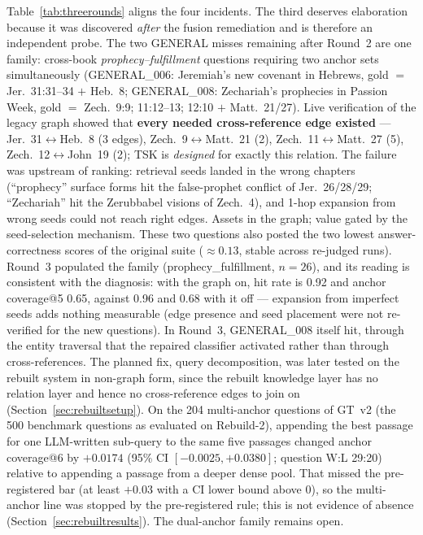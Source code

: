 Table~\ref{tab:threerounds} aligns the four incidents. The third
deserves elaboration because it was discovered \emph{after} the fusion
remediation and is therefore an independent probe. The two GENERAL
misses remaining after Round~2 are one family: cross-book
\emph{prophecy--fulfillment} questions requiring two anchor sets
simultaneously (GENERAL\_006: Jeremiah's new covenant in Hebrews, gold
$=$ Jer.~31:31--34 $+$ Heb.~8; GENERAL\_008: Zechariah's prophecies in
Passion Week, gold $=$ Zech.~9:9; 11:12--13; 12:10 $+$ Matt.~21/27).
Live verification of the legacy graph showed that \textbf{every needed
cross-reference edge existed} --- Jer.~31$\leftrightarrow$Heb.~8 (3 edges),
Zech.~9$\leftrightarrow$Matt.~21 (2), Zech.~11$\leftrightarrow$Matt.~27
(5), Zech.~12$\leftrightarrow$John~19 (2); TSK is \emph{designed} for
exactly this relation. The failure was upstream of ranking: retrieval
seeds landed in the wrong chapters (``prophecy'' surface forms hit the
false-prophet conflict of Jer.~26/28/29; ``Zechariah'' hit the
Zerubbabel visions of Zech.~4), and 1-hop expansion from wrong seeds
could not reach right edges. Assets in the graph; value gated by the
seed-selection mechanism. These two questions also posted the two
lowest answer-correctness scores of the original suite
($\approx 0.13$, stable across re-judged runs). Round~3 populated the
family (prophecy\_fulfillment, $n=26$), and its reading is consistent
with the diagnosis: with the graph on, hit rate is 0.92 and anchor
coverage@5 0.65, against 0.96 and 0.68 with it off --- expansion from
imperfect seeds adds nothing measurable (edge presence and seed
placement were not re-verified for the new questions).
In Round~3, GENERAL\_008 itself hit, through the entity traversal that
the repaired classifier activated rather than through cross-references.
The planned fix, query decomposition, was later tested on the rebuilt
system in non-graph form, since the rebuilt knowledge layer has no
relation layer and hence no cross-reference edges to join on
(Section~\ref{sec:rebuiltsetup}). On the 204 multi-anchor questions of
GT~v2 (the 500 benchmark questions as evaluated on Rebuild-2),
appending the best passage for one LLM-written sub-query to the same
five passages changed anchor coverage@6 by $+0.0174$ (95\% CI
$[-0.0025, +0.0380]$; question W:L 29:20) relative to appending a
passage from a deeper dense pool. That missed the pre-registered
bar (at least $+0.03$ with a CI lower bound above 0), so the
multi-anchor line was stopped by the pre-registered rule; this is not
evidence of absence (Section~\ref{sec:rebuiltresults}). The dual-anchor
family remains open.

